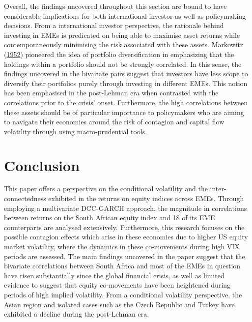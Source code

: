 \documentclass[11pt,preprint, authoryear]{elsarticle}
\numberwithin{equation}{section}
\numberwithin{figure}{section}
\numberwithin{table}{section}
\begin{document}
Overall, the findings uncovered throughout this section are bound to
have considerable implications for both international investor as well
as policymaking decisions. From a international investor perspective,
the rationale behind investing in EMEs is predicated on being able to
maximise asset returns while contemporaneously minimising the risk
associated with these assets. Markowitz
(\protect\hyperlink{ref-markowitz1952portfolio}{1952}) pioneered the
idea of portfolio diversification in emphasizing that the holdings
within a portfolio should not be strongly correlated. In this sense, the
findings uncovered in the bivariate pairs suggest that investors have
less scope to diversify their portfolios purely through investing in
different EMEs. This notion has been emphasised in the post-Lehman era
when contrasted with the correlations prior to the crisis' onset.
Furthermore, the high correlations between these assets should be of
particular importance to policymakers who are aiming to navigate their
economies around the risk of contagion and capital flow volatility
through using macro-prudential tools.

\hypertarget{conclusion}{%
\section{\texorpdfstring{Conclusion
\label{Conclusion}}{Conclusion }}\label{conclusion}}

This paper offers a perspective on the conditional volatility and the
inter-connectedness exhibited in the returns on equity indices across
EMEs. Through employing a multivariate DCC-GARCH approach, the magnitude
in correlations between returns on the South African equity index and 18
of its EME counterparts are analysed extensively. Furthermore, this
research focuses on the possible contagion effects which arise in these
economies due to higher US equity market volatility, where the dynamics
in these co-movements during high VIX periods are assessed. The main
findings uncovered in the paper suggest that the bivariate correlations
between South Africa and most of the EMEs in question have risen
substantially since the global financial crisis, as well as limited
evidence to suggest that equity co-movements have been heightened during
periods of high implied volatility. From a conditional volatility
perspective, the Asian region and isolated cases such as the Czech
Republic and Turkey have exhibited a decline during the post-Lehman era.
\end{document}
